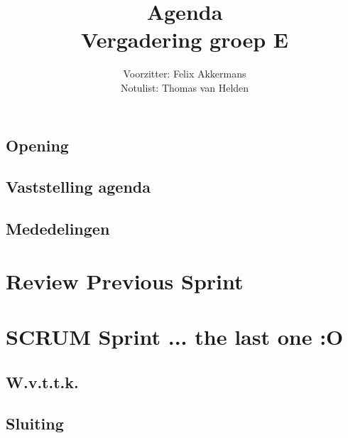 \documentclass[a4paper]{article}
\title{Agenda \\ Vergadering groep E}
\author{Voorzitter: Felix Akkermans \\ Notulist: Thomas van Helden}
\begin{document}
\maketitle
\subsection*{Opening}
\subsection*{Vaststelling agenda}
\subsection*{Mededelingen}
\section{Review Previous Sprint}
\section{SCRUM Sprint ... the last one :O}
\subsection*{W.v.t.t.k.}
\subsection*{Sluiting}
\end{document}
